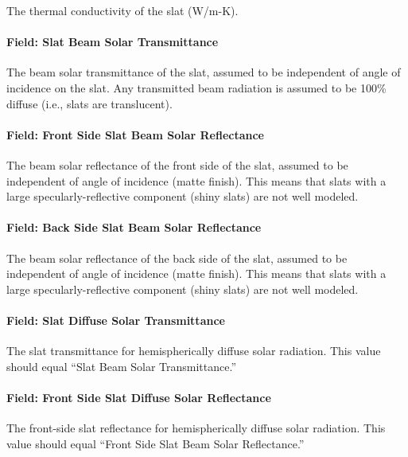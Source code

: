 The thermal conductivity of the slat (W/m-K).

\paragraph{Field: Slat Beam Solar Transmittance}\label{field-slat-beam-solar-transmittance}

The beam solar transmittance of the slat, assumed to be independent of angle of incidence on the slat. Any transmitted beam radiation is assumed to be 100\% diffuse (i.e., slats are translucent).

\paragraph{Field: Front Side Slat Beam Solar Reflectance}\label{field-front-side-slat-beam-solar-reflectance}

The beam solar reflectance of the front side of the slat, assumed to be independent of angle of incidence (matte finish). This means that slats with a large specularly-reflective component (shiny slats) are not well modeled.

\paragraph{Field: Back Side Slat Beam Solar Reflectance}\label{field-back-side-slat-beam-solar-reflectance}

The beam solar reflectance of the back side of the slat, assumed to be independent of angle of incidence (matte finish). This means that slats with a large specularly-reflective component (shiny slats) are not well modeled.

\paragraph{Field: Slat Diffuse Solar Transmittance}\label{field-slat-diffuse-solar-transmittance}

The slat transmittance for hemispherically diffuse solar radiation. This value should equal ``Slat Beam Solar Transmittance.''

\paragraph{Field: Front Side Slat Diffuse Solar Reflectance}\label{field-front-side-slat-diffuse-solar-reflectance}

The front-side slat reflectance for hemispherically diffuse solar radiation. This value should equal ``Front Side Slat Beam Solar Reflectance.''

